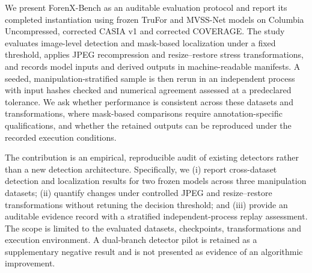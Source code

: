 We present ForenX-Bench as an auditable evaluation protocol and report its completed instantiation using frozen TruFor and MVSS-Net models on Columbia Uncompressed, corrected CASIA v1 and corrected COVERAGE. The study evaluates image-level detection and mask-based localization under a fixed threshold, applies JPEG recompression and resize--restore stress transformations, and records model inputs and derived outputs in machine-readable manifests. A seeded, manipulation-stratified sample is then rerun in an independent process with input hashes checked and numerical agreement assessed at a predeclared tolerance. We ask whether performance is consistent across these datasets and transformations, where mask-based comparisons require annotation-specific qualifications, and whether the retained outputs can be reproduced under the recorded execution conditions.

The contribution is an empirical, reproducible audit of existing detectors rather than a new detection architecture. Specifically, we (i) report cross-dataset detection and localization results for two frozen models across three manipulation datasets; (ii) quantify changes under controlled JPEG and resize--restore transformations without retuning the decision threshold; and (iii) provide an auditable evidence record with a stratified independent-process replay assessment. The scope is limited to the evaluated datasets, checkpoints, transformations and execution environment. A dual-branch detector pilot is retained as a supplementary negative result and is not presented as evidence of an algorithmic improvement.
